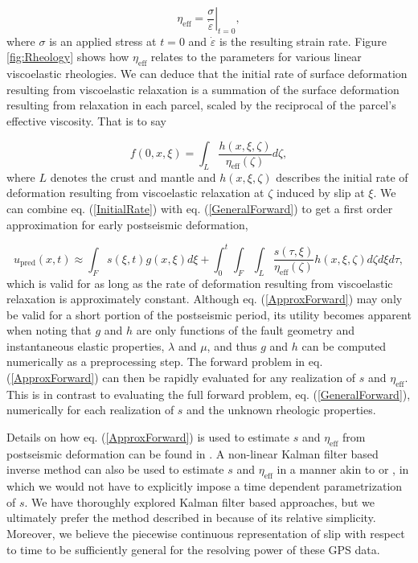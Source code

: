 \documentclass[draft,linenumbers]{AGUJournal}
\begin{document}
\begin{equation}
  \eta_\mathrm{eff} = \left.\frac{\sigma}{\dot{\varepsilon}}\right|_{t=0},
\end{equation}
where $\sigma$ is an applied stress at $t=0$ and $\dot\varepsilon$ is the resulting strain rate.  Figure \ref{fig:Rheology} shows how $\eta_\mathrm{eff}$ relates to the parameters for various linear viscoelastic rheologies.   We can deduce that the initial rate of surface deformation resulting from viscoelastic relaxation is a summation of the surface deformation resulting from relaxation in each parcel, scaled by the reciprocal of the parcel's effective viscosity.  That is to say   

\begin{equation}\label{InitialRate}
  f(0,x,\xi) = \int_L \frac{h(x,\xi,\zeta)}{\eta_\mathrm{eff}(\zeta)} d\zeta, 
\end{equation}
where $L$ denotes the crust and mantle and $h(x,\xi,\zeta)$ describes the initial rate of deformation resulting from viscoelastic relaxation at $\zeta$ induced by slip at $\xi$. We can combine eq. (\ref{InitialRate}) with eq. (\ref{GeneralForward}) to get a first order approximation for early postseismic deformation,

\begin{equation}\label{ApproxForward}
  u_\mathrm{pred}(x,t) \approx \int_F s(\xi,t)g(x,\xi)d\xi + 
           \int_0^t\int_F\int_L \frac{s(\tau,\xi)}{\eta_\mathrm{eff}(\zeta)} h(x,\xi,\zeta) d\zeta d\xi d\tau,
\end{equation}
which is valid for as long as the rate of deformation resulting from viscoelastic relaxation is approximately constant.  Although eq. (\ref{ApproxForward}) may only be valid for a short portion of the postseismic period, its utility becomes apparent when noting that $g$ and $h$ are only functions of the fault geometry and instantaneous elastic properties, $\lambda$ and $\mu$, and thus $g$ and $h$ can be computed numerically as a preprocessing step.  The forward problem in eq. (\ref{ApproxForward}) can then be rapidly evaluated for any realization of $s$ and $\eta_{\mathrm{eff}}$.  This is in contrast to evaluating the full forward problem, eq. (\ref{GeneralForward}), numerically for each realization of $s$ and the unknown rheologic properties. 

Details on how eq. (\ref{ApproxForward}) is used to estimate $s$ and $\eta_\mathrm{eff}$ from postseismic deformation can be found in \citet{Hines2016}.  A non-linear Kalman filter based inverse method can also be used to estimate $s$ and $\eta_{\mathrm{eff}}$ in a manner akin to \citet{Segall1997} or \citet{McGuire2003}, in which we would not have to explicitly impose a time dependent parametrization of $s$. We have thoroughly explored Kalman filter based approaches, but we ultimately prefer the method described in \citet{Hines2016} because of its relative simplicity. Moreover, we believe the piecewise continuous representation of slip with respect to time to be sufficiently general for the resolving power of these GPS data.
\end{document}
